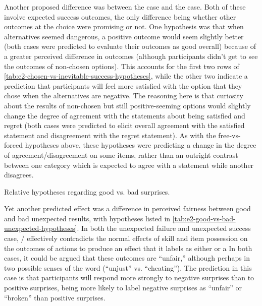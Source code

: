 Another proposed difference was between the \exps{} case and the \obvsm{} case.
%
Both of these involve expected success outcomes, the only difference being whether other outcomes at the choice were promising or not.
%
One hypothesis was that when alternatives seemed dangerous, a positive outcome would seem slightly better (both cases were predicted to evaluate their outcomes as good overall) because of a greater perceived difference in outcomes (although participants didn't get to see the outcomes of non-chosen options).
%
This accounts for the first two rows of \cref{tab:e2-chosen-vs-inevitable-success-hypotheses}, while the other two indicate a prediction that participants will feel more satisfied with the option that they chose when the alternatives are negative.
%
The reasoning here is that curiosity about the results of non-chosen but still positive-seeming options would slightly change the degree of agreement with the statements about being satisfied and regret (both cases were predicted to elicit overall agreement with the satisfied statement and disagreement with the regret statement).
%
As with the free-vs-forced hypotheses above, these hypotheses were predicting a change in the degree of agreement/disagreement on some items, rather than an outright contrast between one category which is expected to agree with a statement while another disagrees.


\begin{table}[!h]
\centering
\bgroup
\def\arraystretch{1.3}
\setlength{\tabcolsep}{0.6em}

\egroup
\caption[Retrospective good vs\@. bad unexpected hypotheses]{Relative hypotheses regarding good vs\@. bad surprises.}
\label{tab:e2-good-vs-bad-unexpected-hypotheses}
\end{table}


Yet another predicted effect was a difference in perceived fairness between good and bad unexpected results, with hypotheses listed in \cref{tab:e2-good-vs-bad-unexpected-hypotheses}.
%
In both the unexpected failure and unexpected success case, \dunyazad/ effectively contradicts the normal effects of skill and item possession on the outcomes of actions to produce an effect that it labels as either  or a 
%
In both cases, it could be argued that these outcomes are ``unfair,'' although perhaps in two possible senses of the word (``unjust'' vs\@. ``cheating'').
%
The prediction in this case is that participants will respond more strongly to negative surprises than to positive surprises, being more likely to label negative surprises as ``unfair'' or ``broken'' than positive surprises.


